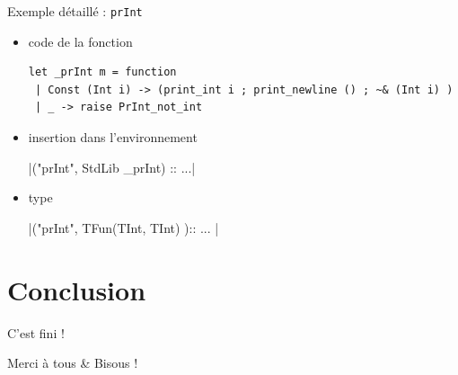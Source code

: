 \documentclass{beamer}
\begin{document}
\begin{frame}[fragile]{Exemple détaillé : \texttt{prInt}}
  \begin{itemize}
  \item code de la fonction
    \begin{verbatim}
let _prInt m = function
 | Const (Int i) -> (print_int i ; print_newline () ; ~& (Int i) )
 | _ -> raise PrInt_not_int
    \end{verbatim}

  \item insertion dans l'environnement

    |("prInt", StdLib _prInt) :: ...|

  \item type

    |("prInt", TFun(TInt, TInt) ):: ... |


  \end{itemize}
\end{frame}

\section{Conclusion}
\begin{frame}{C'est fini !}
  \begin{center}
    \Huge Merci à tous \& Bisous !
  \end{center}
\end{frame}

\begin{frame}
  \begin{center}
    \fontsize{2}{2} \selectfont
    
  \end{center}
\end{frame}
\end{document}
